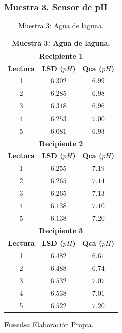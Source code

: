 \subsubsection{Muestra 3. Sensor de pH}
  \begin{table}[H]
        \protect\caption[Muestra 3: Agua de laguna]{Muestra 3: Agua de laguna.}
        \label{tab:TMuestra3}
        \centering
        \begin{tabular}{c c c}
            \hline
            \multicolumn{3}{c}{\textbf{Muestra 3: Agua de laguna.}} \\
             \hline
            \multicolumn{3}{c}{\textbf{Recipiente 1}} \\
            \hline
            \textbf{Lectura}&\textbf{LSD ($pH$)}&\textbf{Qca ($pH$)} \\
            \hline
            {1}& $6.302$&$6.99$ \\ 
            {2}& $6.285$&$6.98$ \\ 
            {3}& $6.318$&$6.96$ \\  
            {4}& $6.253$&$7.00$ \\ 
            {5}& $6.081$&$6.93$ \\
            \hline
            \multicolumn{3}{c}{\textbf{Recipiente 2}} \\
            \hline
            \textbf{Lectura}&\textbf{LSD ($pH$)}&\textbf{Qca ($pH$)} \\
            \hline
            {1}& $6.255$&$7.19$ \\ 
            {2}& $6.265$&$7.14$ \\ 
            {3}& $6.265$&$7.13$ \\  
            {4}& $6.138$&$7.10$ \\ 
            {5}& $6.138$&$7.20$ \\
            \multicolumn{3}{c}{\textbf{Recipiente 3}} \\
            \hline
            \textbf{Lectura}&\textbf{LSD ($pH$)}&\textbf{Qca ($pH$)} \\
            \hline
            {1}& $6.482$&$6.61$ \\ 
            {2}& $6.488$&$6.74$ \\ 
            {3}&$6.532$&$7.07$  \\  
            {4}& $6.538$&$7.01$ \\ 
            {5}& $6.522$&$7.20$ \\
            \hline
        \end{tabular}
        \vspace{5mm}
        \newline
        \hfill \textbf{Fuente: }Elaboración Propia.
    \end{table}

